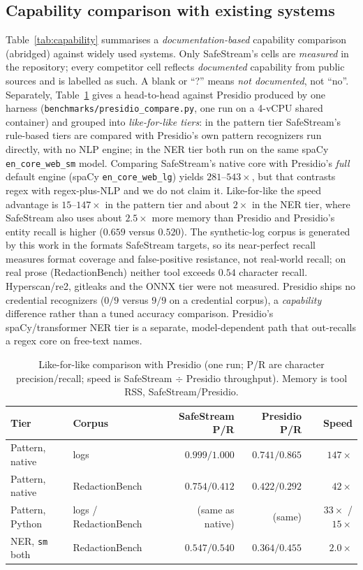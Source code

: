 \documentclass[runningheads]{llncs}
\begin{document}
\subsection{Capability comparison with existing systems}
Table~\ref{tab:capability} summarises a \emph{documentation-based} capability
comparison (abridged) against widely used systems. Only SafeStream's cells are
\emph{measured} in the repository; every competitor cell reflects
\emph{documented} capability from public sources and is labelled as such. A blank
or ``?'' means \emph{not documented}, not ``no''. Separately, Table~\ref{tab:presidio} gives a head-to-head against Presidio
produced by one harness (\texttt{benchmarks/presidio\_compare.py}, one run on a
4-vCPU shared container) and grouped into \emph{like-for-like tiers}: in the pattern
tier SafeStream's rule-based tiers are compared with Presidio's own pattern
recognizers run directly, with no NLP engine; in the NER tier both run on the same
spaCy \texttt{en\_core\_web\_sm} model. Comparing SafeStream's native core with
Presidio's \emph{full} default engine (spaCy \texttt{en\_core\_web\_lg}) yields
$281$--$543\times$, but that contrasts regex with regex-plus-NLP and we do not claim
it. Like-for-like the speed advantage is $15$--$147\times$ in the pattern tier and
about $2\times$ in the NER tier, where SafeStream also uses about $2.5\times$ more
memory than Presidio and Presidio's entity recall is higher ($0.659$ versus $0.520$).
The synthetic-log corpus is generated by this work in the formats SafeStream
targets, so its near-perfect recall measures format coverage and false-positive
resistance, not real-world recall; on real prose (RedactionBench) neither tool
exceeds $0.54$ character recall. Hyperscan/re2, gitleaks and the ONNX tier were not
measured. Presidio ships no credential recognizers ($0/9$ versus $9/9$ on a
credential corpus), a \emph{capability} difference rather than a tuned accuracy
comparison. Presidio's spaCy/transformer NER tier is a separate, model-dependent
path that out-recalls a regex core on free-text names.

\begin{table}[t]
\centering
\caption{Like-for-like comparison with Presidio (one run; P/R are character
precision/recall; speed is SafeStream $\div$ Presidio throughput). Memory is
tool RSS, SafeStream/Presidio.}
\label{tab:presidio}
\begin{tabular}{@{}llrrr@{}}
\toprule
Tier & Corpus & SafeStream P/R & Presidio P/R & Speed \\
\midrule
Pattern, native & logs & $0.999/1.000$ & $0.741/0.865$ & $147\times$ \\
Pattern, native & RedactionBench & $0.754/0.412$ & $0.422/0.292$ & $42\times$ \\
Pattern, Python & logs / RedactionBench & (same as native) & (same) & $33\times$ / $15\times$ \\
NER, \texttt{sm} both & RedactionBench & $0.547/0.540$ & $0.364/0.455$ & $2.0\times$ \\
\bottomrule
\end{tabular}
\end{table}
\end{document}
